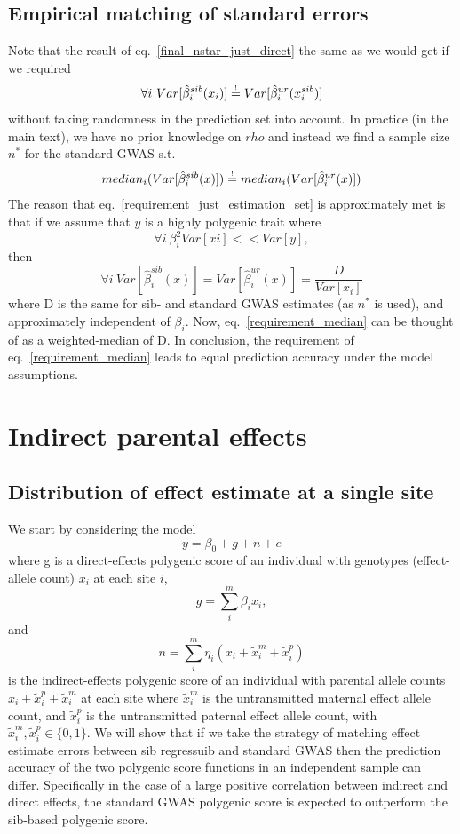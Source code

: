 \documentclass[hidelinks, 12pt]{article}
\begin{document}
\subsection{Empirical matching of standard errors}
\label{Empiricalmatchingofstandarderrors}
Note that the result of eq.~\ref{final_nstar_just_direct} the same as we would get if we required 
\begin{equation}
\label{requirement_just_estimation_set}
\forall i~Var[\hat{\beta}_i^{sib}(x_i)] \reqeq Var[\hat{\beta}_i^{ur}(x_i^{sib})]
\end{equation}
without taking randomness in the prediction set into account.  In practice (in the main text), we have no prior knowledge on $rho$ and instead we find a sample size $n^*$ for the standard GWAS s.t. 
\begin{equation}
\label{requirement_median}
median_i(Var[\hat{\beta}_i^{sib}(x)]) \reqeq median_i(Var[\hat{\beta}_i^{ur}(x)])
\end{equation}
The reason that eq.~\ref{requirement_just_estimation_set} is approximately met is that if we assume that $y$ is a highly polygenic trait where
$$ \forall i~\beta_i^2Var[xi] << Var[y],$$
then 
$$\forall i~Var[\hat{\beta}_i^{sib}(x)]=Var[\hat{\beta}_i^{ur}(x)]=\frac{D}{Var[x_i]}$$
where D is the same for sib- and standard GWAS estimates (as $n^*$ is used), and approximately independent of $\beta_i$.  Now, eq.~\ref{requirement_median} can be thought of as a weighted-median of D. In conclusion, the requirement of eq.~\ref{requirement_median} leads to equal prediction accuracy under the model assumptions.

\pagebreak

\section{Indirect parental effects}
\subsection{Distribution of effect estimate at a single site}
We start by considering the model
$$y=\beta_0+g+n+e$$
where g is a direct-effects polygenic score of an individual with genotypes (effect-allele count) $x_i$ at each site $i$,
$$g=\sum_i^m\beta_ix_i,$$ 
and 
$$n=\sum_i^m\eta_i(x_i+\tilde{x}_i^m+\tilde{x}_i^p)$$ 
is the indirect-effects polygenic score of an individual with parental allele counts $x_i+\tilde{x}_i^p+\tilde{x}_i^m$ at each site where $\tilde{x}_i^m$ is the untransmitted maternal effect allele count, and $\tilde{x}_i^p$ is the untransmitted paternal effect allele count, with $\tilde{x}_i^m,\tilde{x}_i^p \in \{0,1\}$.  We will show that if we take the strategy of matching effect estimate errors between sib regressuib and standard GWAS then the prediction accuracy of the two polygenic score functions in an independent sample can differ. Specifically in the case of a large positive correlation between indirect and direct effects, the standard GWAS polygenic score is expected to outperform the sib-based polygenic score.
\end{document}
